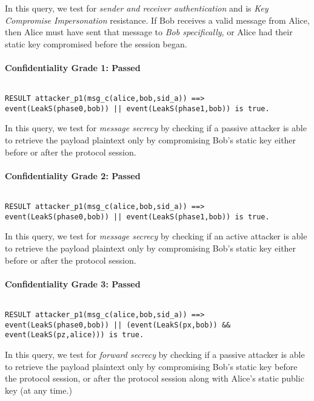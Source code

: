 In this query, we test for \emph{sender and receiver authentication} and is \emph{Key Compromise Impersonation} resistance. If Bob receives a valid message from Alice, then Alice must have sent that message to \emph{Bob specifically}, or Alice had their static key compromised before the session began.


\paragraph{Confidentiality Grade 1: Passed}$ $
\begin{lstlisting}
RESULT attacker_p1(msg_c(alice,bob,sid_a)) ==> event(LeakS(phase0,bob)) || event(LeakS(phase1,bob)) is true.
\end{lstlisting}

In this query, we test for \emph{message secrecy} by checking if a passive attacker is able to retrieve the payload plaintext only by compromising Bob's static key either before or after the protocol session.


\paragraph{Confidentiality Grade 2: Passed}$ $
\begin{lstlisting}
RESULT attacker_p1(msg_c(alice,bob,sid_a)) ==> event(LeakS(phase0,bob)) || event(LeakS(phase1,bob)) is true.
\end{lstlisting}

In this query, we test for \emph{message secrecy} by checking if an active attacker is able to retrieve the payload plaintext only by compromising Bob's static key either before or after the protocol session.


\paragraph{Confidentiality Grade 3: Passed}$ $
\begin{lstlisting}
RESULT attacker_p1(msg_c(alice,bob,sid_a)) ==> event(LeakS(phase0,bob)) || (event(LeakS(px,bob)) && event(LeakS(pz,alice))) is true.
\end{lstlisting}

In this query, we test for \emph{forward secrecy} by checking if a passive attacker is able to retrieve the payload plaintext only by compromising Bob's static key before the protocol session, or after the protocol session along with Alice's static public key (at any time.)


